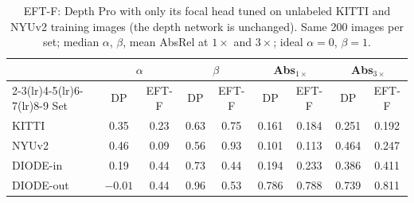 \begin{table}[t]\centering\small
\caption{EFT-F: Depth Pro with only its focal head tuned on unlabeled KITTI and NYUv2 training images (the depth network is unchanged). Same 200 images per set; median $\alpha$, $\beta$, mean AbsRel at $1\times$ and $3\times$; ideal $\alpha=0$, $\beta=1$.}\label{tab:eftf}
\footnotesize\setlength{\tabcolsep}{2pt}
\begin{tabular}{lcccccccc}\toprule
& \multicolumn{2}{c}{$\alpha$} & \multicolumn{2}{c}{$\beta$} & \multicolumn{2}{c}{Abs$_{1\times}$} & \multicolumn{2}{c}{Abs$_{3\times}$} \\ \cmidrule(lr){2-3}\cmidrule(lr){4-5}\cmidrule(lr){6-7}\cmidrule(lr){8-9}
Set & DP & EFT-F & DP & EFT-F & DP & EFT-F & DP & EFT-F \\ \midrule
KITTI & 0.35 & 0.23 & 0.63 & 0.75 & 0.161 & 0.184 & 0.251 & 0.192 \\
NYUv2 & 0.46 & 0.09 & 0.56 & 0.93 & 0.101 & 0.113 & 0.464 & 0.247 \\
DIODE-in & 0.19 & 0.44 & 0.73 & 0.44 & 0.194 & 0.233 & 0.386 & 0.411 \\
DIODE-out & \ensuremath{-0.01} & 0.44 & 0.96 & 0.53 & 0.786 & 0.788 & 0.739 & 0.811 \\
\bottomrule\end{tabular}\end{table}
